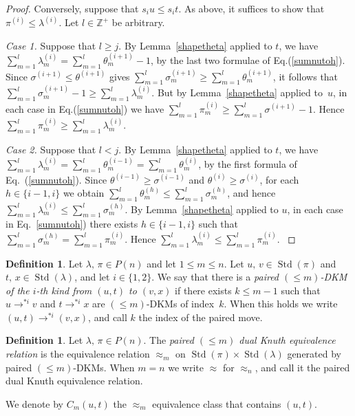 \documentclass[10pt]{amsart}
\theoremstyle{definition}
\newtheorem{defi}[theo]{Definition}
\newenvironment{Case}[1]{\smallskip\noindent\emph{Case #1}\endgraf
 \nobreak\noindent\ignorespaces}{\endgraf\smallskip}
\DeclareMathOperator{\STD}{Std}
\begin{document}
\begin{proof}
Conversely, suppose that $s_iu\leqslant s_it$. As above, it suffices to show that
$\pi^{(i)}\leqslant\lambda^{(i)}$. Let $l\in\mathbb{Z}^+$ be arbitrary.

\begin{Case}{1.}
Suppose that $l\geqslant j$. By Lemma~\ref{shapetheta} applied to $t$,
we have $\sum_{m=1}^l \lambda^{(i)}_m = \sum_{m=1}^l \theta^{(i+1)}_m - 1$,
by the last two formulae of Eq.(\ref{sumnutoh}).
Since $\sigma^{(i+1)}\leqslant\theta^{(i+1)}$ gives
$\sum_{m=1}^l \sigma^{(i+1)}_m \geqslant \sum_{m=1}^l \theta^{(i+1)}_m$,
it follows that
$\sum_{m=1}^l \sigma^{(i+1)}_m - 1\geqslant \sum_{m=1}^l \lambda^{(i)}_m$.
But by Lemma~\ref{shapetheta} applied to~$u$, in each case
in Eq.(\ref{sumnutoh}) we have
$\sum_{m=1}^l \pi^{(i)}_m\geqslant \sum_{m=1}^l \sigma^{(i+1)}-1$.
Hence $\sum_{m=1}^l \pi^{(i)}_m \geqslant \sum_{m=1}^l \lambda^{(i)}_m$.
\end{Case}

\begin{Case}{2.}
Suppose that $l<j$. By Lemma~\ref{shapetheta} applied to $t$, we have
$\sum_{m=1}^l \lambda^{(i)}_m = \sum_{m=1}^l \theta^{(i-1)}_m=\sum_{m=1}^l \theta^{(i)}_m$,
by the first formula of Eq.~(\ref{sumnutoh}). Since $\theta^{(i-1)}\geqslant\sigma^{(i-1)}$ and
$\theta^{(i)}\geqslant\sigma^{(i)}$, for each $h\in\{i-1,i\}$ we obtain
$\sum_{m=1}^l \theta^{(h)}_m\leqslant\sum_{m=1}^l \sigma^{(h)}_m$, and hence
$\sum_{m=1}^l \lambda^{(i)}_m\leqslant\sum_{m=1}^l \sigma^{(h)}_m$.
By Lemma~\ref{shapetheta} applied to $u$,
in each case in Eq.~\ref{sumnutoh}) there exists $h\in\{i-1,i\}$
such that $\sum_{m=1}^l \sigma^{(h)}_m = \sum_{m=1}^l \pi^{(i)}_m$.
Hence $\sum_{m=1}^l \lambda^{(i)}_m\leqslant\sum_{m=1}^l \pi^{(i)}_m $.\qedhere
\end{Case}
\end{proof}

\begin{defi}\label{paireddualKmove}
Let $\lambda,\,\pi\in P(n)$ and let $1\leqslant m\leqslant n$.
Let $u,\,v \in \STD(\pi)$ and $t,\,x\in\STD(\lambda)$, and let
$i\in\{1,2\}$. We say that there is a \emph{paired
$(\leqslant m)$-DKM
of the $i$-th kind from $(u,t)$ to $(v,x)$} if there
exists $k\leqslant m-1$ such that $u\to^{*i}v$ and $t\to^{*i}x$ are
$(\leqslant m)$-DKMs
of index~$k$.
When this holds we write $(u,t)\to^{*i}(v,x)$, and call $k$ the index
of the paired move.
\end{defi}
\begin{defi}
Let $\lambda,\,\pi\in P(n)$. The \emph{paired $(\leqslant m)$ dual
Knuth equivalence relation} is the equivalence relation $\approx_m$ on
$\STD(\pi)\times\STD(\lambda)$ generated by paired
$(\leqslant m)$-DKMs.
When $m=n$ we write $\approx$ for $\approx_n$, and call it
the paired dual Knuth equivalence relation.
\end{defi}
We denote by $C_m(u,t)$ the $\approx_m$ equivalence class that contains $(u,t)$.
\end{document}
